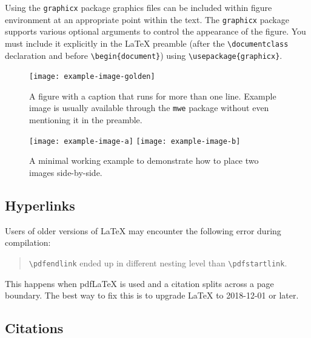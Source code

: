 \documentclass[11pt]{article}
\begin{document}
Using the \verb|graphicx| package graphics files can be included within figure
environment at an appropriate point within the text.
The \verb|graphicx| package supports various optional arguments to control the
appearance of the figure.
You must include it explicitly in the \LaTeX{} preamble (after the
\verb|\documentclass| declaration and before \verb|\begin{document}|) using
\verb|\usepackage{graphicx}|.

\begin{figure}[t]
  \texttt{[image: example-image-golden]}
  \caption{A figure with a caption that runs for more than one line.
    Example image is usually available through the \texttt{mwe} package
    without even mentioning it in the preamble.}
  \label{fig:experiments}
\end{figure}

\begin{figure}[t]
  \texttt{[image: example-image-a]} \hfill
  \texttt{[image: example-image-b]}
  \caption {A minimal working example to demonstrate how to place
    two images side-by-side.}
\end{figure}

\subsection{Hyperlinks}

Users of older versions of \LaTeX{} may encounter the following error during compilation:
\begin{quote}
\verb|\pdfendlink| ended up in different nesting level than \verb|\pdfstartlink|.
\end{quote}
This happens when pdf\LaTeX{} is used and a citation splits across a page boundary. The best way to fix this is to upgrade \LaTeX{} to 2018-12-01 or later.

\subsection{Citations}
\end{document}

